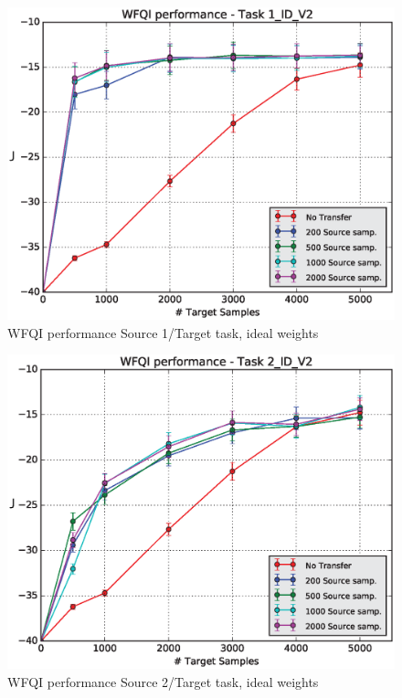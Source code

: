     \begin{figure}[H]
      \raggedbottom
      \centering
      \includegraphics[scale=0.5]{images/WFQIPerf1_ID_V2.eps}
      \caption{WFQI performance Source 1/Target task, ideal weights}
      \label{perf1E}
    \end{figure}
    \begin{figure}[H]
      \raggedbottom
      \centering
      \includegraphics[scale=0.5]{images/WFQIPerf2_ID_V2.eps}
      \caption{WFQI performance Source 2/Target task, ideal weights}
      \label{perf2E}
    \end{figure}
